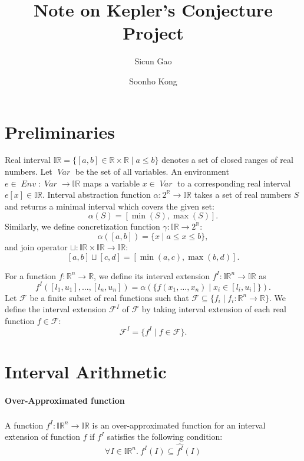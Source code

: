 \documentclass{article}
\title{Note on Kepler's Conjecture Project}
\author{Sicun Gao \and Soonho Kong}
\newcommand{\Var}{\mathop{\mathit{Var}}}
\newcommand{\Env}{\mathop{\mathit{Env}}}
\begin{document}
\maketitle
\section{Preliminaries}

Real interval $\mathbb{IR} = \{ [a, b] \in \mathbb{R} \times
\mathbb{R} \mid a \le b \}$ denotes a set of closed ranges of real
numbers. Let $\Var$ be the set of all variables. An environment $e \in
\Env : \Var \to \mathbb{IR}$ maps a variable $x \in \Var$ to a
corresponding real interval $e[x] \in \mathbb{IR}$. Interval
abstraction function $\alpha : 2^{\mathbb{R}} \to \mathbb{IR}$ takes a
set of real numbers $S$ and returns a minimal interval which covers
the given set:
\[
\alpha(S) = [\min(S), \max(S)].
\]
Similarly, we define concretization function $\gamma : \mathbb{IR} \to
2^{\mathbb{R}}$:
\[
\alpha([a, b]) = \{ x \mid a \le x \le b \},
\]
and join operator $\sqcup : \mathbb{IR} \times \mathbb{IR} \to
\mathbb{IR}$:
\[
[a,b] \sqcup [c, d] = [\min(a,c), \max(b, d)].
\]


For a function $f : \mathbb{R}^n \to \mathbb{R}$, we define its
interval extension $f^I : \mathbb{IR}^n \to \mathbb{IR}$ as
\[
f^I ([l_1, u_1], \dots, [l_n, u_n]) =
\alpha(\{ f(x_1, \dots, x_n) \mid x_i  \in [l_i, u_i] \}).
\]
Let $\mathcal{F}$ be a finite subset of real functions such that
$\mathcal{F} \subseteq \{f_i \mid f_i : \mathbb{R}^n \to \mathbb{R}
\}$. We define the interval extension $\mathcal{F}^I$ of $\mathcal{F}$
by taking interval extension of each real function $f \in
\mathcal{F}$:
\[
\mathcal{F}^I = \{ f^I \mid f \in \mathcal{F} \}.
\]

\section{Interval Arithmetic}
\paragraph{Over-Approximated  function}

A function $\widehat{f^I} : \mathbb{IR}^n \to \mathbb{IR}$ is an
over-approximated function for an interval extension of function $f$ if
$f^I$ satisfies the following condition:
\[
\forall I \in \mathbb{IR}^n. \
f^I(I) \subseteq \widehat{f^I}(I)
\]
\end{document}
